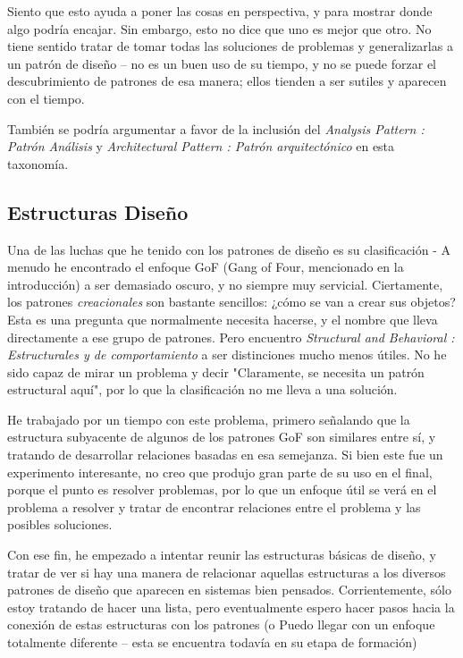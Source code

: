 Siento que esto ayuda a poner las cosas en perspectiva, y para mostrar donde algo podría encajar. Sin embargo, esto no dice que uno es mejor que otro. No tiene sentido tratar de tomar todas las soluciones de problemas y generalizarlas a un patrón de diseño – no es un buen uso de su tiempo, y no se puede forzar el descubrimiento de patrones de esa manera; ellos tienden a ser sutiles y aparecen con el tiempo.     \newline

También se podría argumentar a favor de la inclusión del \textit{Analysis Pattern : Patrón Análisis} y \textit{Architectural Pattern : Patrón arquitectónico} en esta taxonomía.

\newpage

\subsection*{Estructuras Diseño}
\label{subsec:estd}

Una de las luchas que he tenido con los patrones de diseño es su clasificación - A menudo he encontrado el enfoque GoF (Gang of Four, mencionado en la introducción) a ser demasiado oscuro, y no siempre muy servicial. Ciertamente, los patrones \textit{creacionales} son bastante sencillos: ¿cómo se van a crear sus objetos? Esta es una pregunta que normalmente necesita hacerse, y el nombre que lleva directamente a ese grupo de patrones. Pero encuentro \textit{Structural and Behavioral : Estructurales y de comportamiento} a ser distinciones mucho menos útiles. No he sido capaz de mirar un problema y decir "Claramente, se necesita un patrón estructural aquí", por lo que la clasificación no me lleva a una solución.  \newline

He trabajado por un tiempo con este problema, primero señalando que la estructura subyacente de algunos de los patrones GoF son similares entre sí, y tratando de desarrollar relaciones basadas en esa semejanza. 
Si bien este fue un experimento interesante, no creo que produjo gran parte de su uso en el final, porque el punto es resolver problemas, por lo que un enfoque útil se verá en el problema a resolver y tratar de encontrar relaciones entre el problema y las posibles soluciones. \newline

Con ese fin, he empezado a intentar reunir las estructuras básicas de diseño, y tratar de ver si hay una manera de relacionar aquellas estructuras a los diversos patrones de diseño que aparecen en sistemas bien pensados. Corrientemente, sólo estoy tratando de hacer una lista, pero eventualmente espero hacer pasos hacia la conexión de estas estructuras con los patrones (o Puedo llegar con un enfoque totalmente diferente – esta se encuentra todavía en su etapa de formación)  \newline

